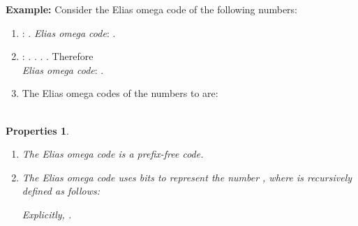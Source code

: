 \documentclass[11pt]{article}
\newtheorem{properties}{Properties}
\begin{document}
{\bf Example:} Consider the Elias omega code of the following numbers:
\begin{enumerate}
\item : .
{\sl Elias omega code}: .
\item :
  . . . . Therefore
  \\
{\sl Elias omega code}: .
\item The Elias omega codes of the numbers  to  are:
\\ \\ 

\end{enumerate}
\begin{properties}\label{p:eomega}
\mbox{}\\
\begin{enumerate} 
\item The Elias omega code is a prefix-free code.
\item The Elias omega code uses  bits to represent
  the number , where  is recursively defined as follows:

Explicitly, .
\end{enumerate}
\end{properties}
\end{document}
